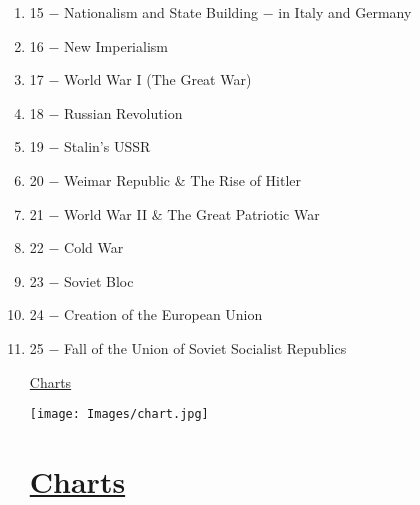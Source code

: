 \documentclass[12pt]{article}
\begin{document}
\begin{enumerate}
\item 15 $-$ Nationalism and State Building $-$ in Italy and Germany

\item 16 $-$ New Imperialism

\item 17 $-$ World War I (The Great War)

\item 18 $-$ Russian Revolution

\item 19 $-$ Stalin's USSR

\item 20 $-$ Weimar Republic \& The Rise of Hitler

\item 21 $-$ World War II \& The Great Patriotic War

\item 22 $-$ Cold War

\item 23 $-$ Soviet Bloc

\item 24 $-$ Creation of the European Union

\item 25 $-$ Fall of the Union of Soviet Socialist Republics

\newpage
\begin{center}
\end{center}
\begin{center}
\end{center}
\begin{center}
\underline{\Huge Charts}
\end{center}
\vspace{50pt}
\begin{center}
\texttt{[image: Images/chart.jpg]}
\end{center}
\newpage

\section{\underline{Charts}}

\hspace{-25pt} \begin{tabular}{|p{}|p{}|p{}|p{}|p{}|p{}|}


\end{tabular}
\end{enumerate}
\end{document}
